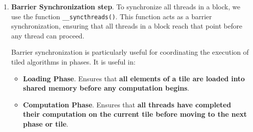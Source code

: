 \begin{enumerate}
    Once the data is loaded into shared memory, each thread uses the loaded values to update the partial product value $\texttt{PValue}$ for the resulting matrix $P$:
    \begin{itemize}
        \item $\texttt{thread}_{0,0}$:
        \begin{lstlisting}[language=C++]
$\texttt{PValue}_{0,0}$ += $\texttt{Mds}_{0,0}$ * $\texttt{Nds}_{0,0}$ + $\texttt{Mds}_{0,1}$ * $\texttt{Nds}_{1,0}$\end{lstlisting}

        \item $\texttt{thread}_{0,1}$:
        \begin{lstlisting}[language=C++]
$\texttt{PValue}_{0,1}$ += $\texttt{Mds}_{0,0}$ * $\texttt{Nds}_{0,1}$ + $\texttt{Mds}_{0,1}$ * $\texttt{Nds}_{1,1}$\end{lstlisting}
        \item $\texttt{thread}_{1,0}$:
        \begin{lstlisting}[language=C++]
$\texttt{PValue}_{1,0}$ += $\texttt{Mds}_{1,0}$ * $\texttt{Nds}_{0,0}$ + $\texttt{Mds}_{1,1}$ * $\texttt{Nds}_{1,0}$\end{lstlisting}
        \item $\texttt{thread}_{1,1}$:
        \begin{lstlisting}[language=C++]
$\texttt{PValue}_{1,1}$ += $\texttt{Mds}_{1,0}$ * $\texttt{Nds}_{0,1}$ + $\texttt{Mds}_{1,1}$ * $\texttt{Nds}_{1,1}$\end{lstlisting}
    \end{itemize}

    \item \textbf{Barrier Synchronization step}. To synchronize all threads in a block, we use the function \texttt{\_\_syncthreads()}. This function acts as a barrier synchronization, ensuring that all threads in a block reach that point before any thread can proceed.
    
    Barrier synchronization is particularly useful for coordinating the execution of tiled algorithms in phases. It is useful in:
    \begin{itemize}[label=\textcolor{Green3}{}]
        \item \textbf{Loading Phase}. Ensures that \textbf{all elements of a tile are loaded into shared memory before any computation begins}.
        \item \textbf{Computation Phase}. Ensures that \textbf{all threads have completed their computation on the current tile before moving to the next phase or tile}.
    \end{itemize}
\end{enumerate}
